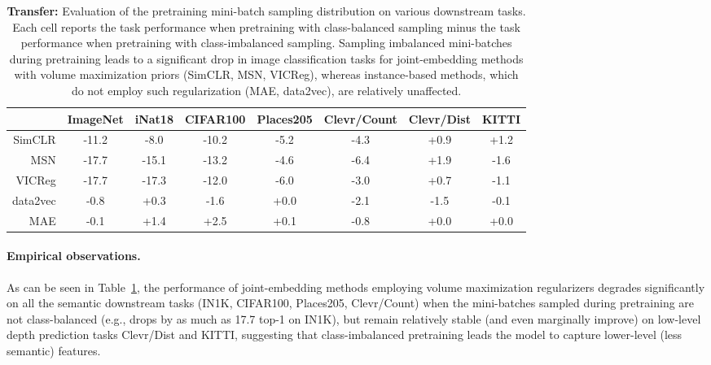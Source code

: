 \documentclass{article} %
\begin{document}
\begin{table}[h]
    \centering
    \footnotesize
    \caption{\textbf{Transfer:} Evaluation of the pretraining mini-batch sampling distribution on various downstream tasks. Each cell reports the task performance when pretraining with class-balanced sampling minus the task performance when pretraining with class-imbalanced sampling. Sampling imbalanced mini-batches during pretraining leads to a significant drop in image classification tasks for joint-embedding methods with volume maximization priors (SimCLR, MSN, VICReg), whereas instance-based methods, which do not employ such regularization (MAE, data2vec), are relatively unaffected.
    }
    \label{tb:class_stratified_sampling}
    \begin{tabular}{r|ccccc|cc}
        \toprule
        & ImageNet & iNat18 & CIFAR100 & Places205 & Clevr/Count & Clevr/Dist & KITTI\\
        \toprule\toprule
        SimCLR & \color{red} -11.2 & \color{red}-8.0 & \color{red}-10.2 & \color{red}-5.2 & \color{red}-4.3 & +0.9 & +1.2 \\
        MSN & \color{red}-17.7 & \color{red}-15.1 & \color{red}-13.2 & \color{red}-4.6 & \color{red}-6.4 & +1.9 & -1.6 \\
        VICReg & \color{red}-17.7 & \color{red}-17.3 & \color{red}-12.0 & \color{red}-6.0 & \color{red}-3.0 & +0.7 & -1.1 \\\midrule
        data2vec & -0.8 & +0.3 & -1.6 & +0.0 & -2.1 & -1.5 & -0.1 \\
        MAE & -0.1 & +1.4 & +2.5 & +0.1 & -0.8 & +0.0 & +0.0 \\\bottomrule
    \end{tabular}
\end{table}



\paragraph{Empirical observations.}
As can be seen in Table~\ref{tb:class_stratified_sampling}, the performance of joint-embedding methods employing volume maximization regularizers degrades significantly on all the semantic downstream tasks (IN1K, CIFAR100, Places205, Clevr/Count) when the mini-batches sampled during pretraining are not class-balanced (e.g., drops by as much as 17.7 top-1 on IN1K), but remain relatively stable (and even marginally improve) on low-level depth prediction tasks Clevr/Dist and KITTI, suggesting that class-imbalanced pretraining leads the model to capture lower-level (less semantic) features. 
\end{document}
